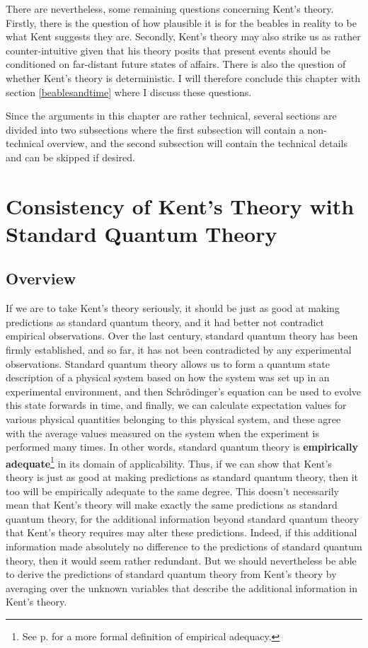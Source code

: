 \documentclass[12pt]{report}
\begin{document}
There are nevertheless, some remaining questions concerning Kent's theory. Firstly, there is the question of how plausible it is for the  beables in reality to be what Kent suggests they are. Secondly, Kent's theory may also strike us as rather counter-intuitive given that his theory posits that present events should be conditioned on far-distant future states of affairs. There is also the question of whether Kent's theory is deterministic. I will therefore conclude this chapter with section \ref{beablesandtime} where I discuss these questions.

Since the arguments in this chapter are rather technical, several sections are divided into two subsections where the first subsection will contain a non-technical overview, and the second subsection will contain the technical details and can be skipped if desired.  

\section{Consistency of Kent's Theory with Standard Quantum Theory\label{kentinterpretationconsistency}}
\subsection{Overview}
If we are to take Kent's theory seriously, it should be just as good at making predictions as standard quantum theory, and it had better not contradict empirical observations. Over the last century, standard quantum theory has been firmly established, and so far, it has not been contradicted by any experimental observations. Standard quantum theory allows us to form a quantum state description of a physical system based on how the system was set up in an experimental environment, and then Schr\"{o}dinger's equation can be used to evolve this state forwards in time, and finally, we can calculate expectation values for various physical quantities belonging to this physical system, and these agree with the average values measured on the system when the experiment is performed many times. In other words, standard quantum theory is \textbf{empirically adequate}\footnote{See p. \pageref{adeq} for a more formal definition of empirical adequacy.} in its domain of applicability. Thus, if we can show that Kent's theory is just as good at making predictions as standard quantum theory, then it too will be empirically adequate to the same degree. This doesn't necessarily mean that Kent's theory will make exactly the same predictions as standard quantum theory, for the additional information  beyond standard quantum theory that Kent's theory requires may alter these predictions. Indeed, if this additional information made absolutely no difference to the predictions of standard quantum theory, then it would seem rather redundant. But we should nevertheless be able to derive the predictions of standard quantum theory from Kent's theory by averaging over the unknown variables that describe the additional information in Kent's theory.  
\end{document}
